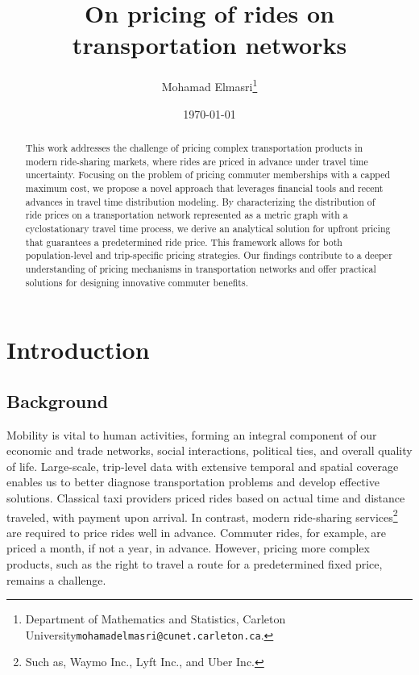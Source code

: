 \documentclass[12pt]{article}
\begin{document}
\title{On pricing of rides on transportation networks}

\author{Mohamad Elmasri\thanks{Department of Mathematics and Statistics, Carleton University\texttt{mohamadelmasri@cunet.carleton.ca}.}}
\date{\today}
\maketitle
\tableofcontents

\vspace{-0.25in}
\begin{abstract}
    This work addresses the challenge of pricing complex transportation products in modern ride-sharing markets, where rides are priced in advance under travel time uncertainty.  Focusing on the problem of pricing commuter memberships with a capped maximum cost, we propose a novel approach that leverages financial tools and recent advances in travel time distribution modeling.  By characterizing the distribution of ride prices on a transportation network represented as a metric graph with a cyclostationary travel time process, we derive an analytical solution for upfront pricing that guarantees a predetermined ride price. This framework allows for both population-level and trip-specific pricing strategies.  Our findings contribute to a deeper understanding of pricing mechanisms in transportation networks and offer practical solutions for designing innovative commuter benefits.
\end{abstract}
\section{Introduction}
\subsection{Background}
Mobility is vital to human activities, forming an integral component of our economic and trade networks, social interactions, political ties, and overall quality of life. Large-scale, trip-level data with extensive temporal and spatial coverage enables us to better diagnose transportation problems and develop effective solutions. Classical taxi providers priced rides based on actual time and distance traveled, with payment upon arrival. In contrast, modern ride-sharing services\footnote{Such as, Waymo Inc., Lyft Inc., and Uber Inc.} are required to price rides well in advance. Commuter rides, for example, are priced a month, if not a year, in advance. However, pricing more complex products, such as the right to travel a route for a predetermined fixed price, remains a challenge.
\end{document}
